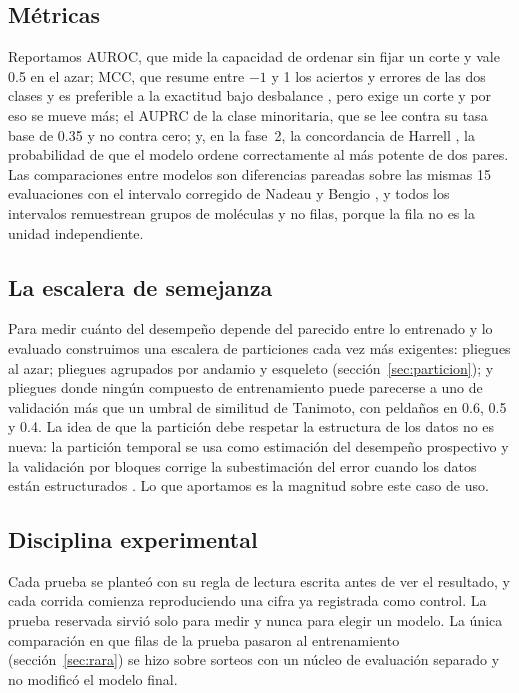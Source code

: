 \documentclass[twocolumn,10pt,letterpaper]{article}
\begin{document}
\subsection{Métricas}

Reportamos AUROC, que mide la capacidad de ordenar sin fijar un corte y vale 0.5 en el azar; MCC, que resume entre $-1$ y 1 los aciertos y errores de las dos clases y es preferible a la exactitud bajo desbalance \autocite{chicco2020}, pero exige un corte y por eso se mueve más; el AUPRC de la clase minoritaria, que se lee contra su tasa base de 0.35 y no contra cero; y, en la fase~2, la concordancia de Harrell \autocite{harrell1982yield}, la probabilidad de que el modelo ordene correctamente al más potente de dos pares. Las comparaciones entre modelos son diferencias pareadas sobre las mismas 15 evaluaciones con el intervalo corregido de Nadeau y Bengio \autocite{nadeau2003inference}, y todos los intervalos remuestrean grupos de moléculas y no filas, porque la fila no es la unidad independiente.

\subsection{La escalera de semejanza}
\label{sec:escalera}

Para medir cuánto del desempeño depende del parecido entre lo entrenado y lo evaluado construimos una escalera de particiones cada vez más exigentes: pliegues al azar; pliegues agrupados por andamio y esqueleto (sección~\ref{sec:particion}); y pliegues donde ningún compuesto de entrenamiento puede parecerse a uno de validación más que un umbral de similitud de Tanimoto, con peldaños en 0.6, 0.5 y 0.4. La idea de que la partición debe respetar la estructura de los datos no es nueva: la partición temporal se usa como estimación del desempeño prospectivo \autocite{sheridan2013} y la validación por bloques corrige la subestimación del error cuando los datos están estructurados \autocite{roberts2017crossvalidation}. Lo que aportamos es la magnitud sobre este caso de uso.

\subsection{Disciplina experimental}

Cada prueba se planteó con su regla de lectura escrita antes de ver el resultado, y cada corrida comienza reproduciendo una cifra ya registrada como control. La prueba reservada sirvió solo para medir y nunca para elegir un modelo. La única comparación en que filas de la prueba pasaron al entrenamiento (sección~\ref{sec:rara}) se hizo sobre sorteos con un núcleo de evaluación separado y no modificó el modelo final.
\end{document}
